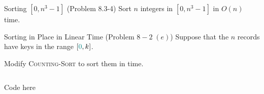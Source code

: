 
\begin{frame}{}
  \begin{exampleblock}{Sorting $[0, n^3-1]$ (Problem 8.3-4)}
    Sort $n$ integers in $[0, n^3-1]$ in $O(n)$ time.
  \end{exampleblock}
\end{frame}

\begin{frame}{}
  \begin{exampleblock}{Sorting in Place in Linear Time (Problem $8-2\; (e)$)}
    Suppose that the $n$ records have keys in the range $[\textcolor{teal}{0}, k]$.

    Modify \textsc{Counting-Sort} to sort them  in  time.
  \end{exampleblock}

  \begin{columns}
      \pause
      \pause

      \pause
  \end{columns}
\end{frame}

\begin{frame}{}
  \begin{columns}

      \centerline{\texttt{}}
      Code here
  \end{columns}
\end{frame}
